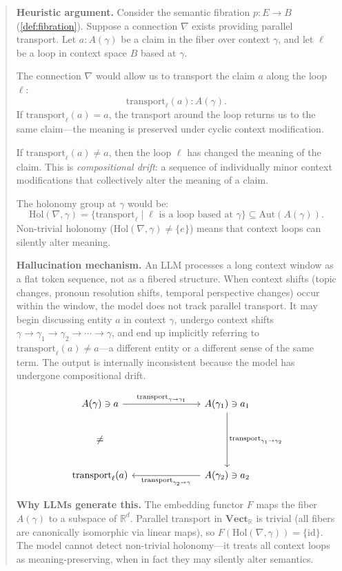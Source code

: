 \documentclass[11pt,a4paper]{article}
\theoremstyle{plain}
\theoremstyle{definition}
\theoremstyle{remark}
\newcommand{\Vect}{\mathbf{Vect}}
\newcommand{\transport}{\mathrm{transport}}
\newcommand{\id}{\mathrm{id}}
\newcommand{\R}{\mathbb{R}}
\begin{document}
\begin{quote}
\textbf{Heuristic argument.} Consider the semantic fibration $p: E \to B$ (\cref{def:fibration}). Suppose a connection $\nabla$ exists providing parallel transport. Let $a : A(\gamma)$ be a claim in the fiber over context $\gamma$, and let $\ell$ be a loop in context space $B$ based at $\gamma$.

The connection $\nabla$ would allow us to transport the claim $a$ along the loop $\ell$:
\[
\transport_\ell(a) : A(\gamma).
\]
If $\transport_\ell(a) = a$, the transport around the loop returns us to the same claim---the meaning is preserved under cyclic context modification.

If $\transport_\ell(a) \neq a$, then the loop $\ell$ has changed the meaning of the claim. This is \emph{compositional drift}: a sequence of individually minor context modifications that collectively alter the meaning of a claim.

The holonomy group at $\gamma$ would be:
\[
\mathrm{Hol}(\nabla, \gamma) = \{ \transport_\ell \mid \ell \text{ is a loop based at } \gamma \} \subseteq \mathrm{Aut}(A(\gamma)).
\]
Non-trivial holonomy ($\mathrm{Hol}(\nabla, \gamma) \neq \{e\}$) means that context loops can silently alter meaning.

\textbf{Hallucination mechanism.} An LLM processes a long context window as a flat token sequence, not as a fibered structure. When context shifts (topic changes, pronoun resolution shifts, temporal perspective changes) occur within the window, the model does not track parallel transport. It may begin discussing entity $a$ in context $\gamma$, undergo context shifts $\gamma \to \gamma_1 \to \gamma_2 \to \cdots \to \gamma$, and end up implicitly referring to $\transport_\ell(a) \neq a$---a different entity or a different sense of the same term. The output is internally inconsistent because the model has undergone compositional drift.

\[
\begin{tikzcd}[column sep=2.5cm, row sep=2cm]
A(\gamma) \ni a \arrow[r, "\transport_{\gamma \to \gamma_1}"] \arrow[d, phantom, "\neq" description] & A(\gamma_1) \ni a_1 \arrow[d, "\transport_{\gamma_1 \to \gamma_2}"] \\
\transport_\ell(a) & A(\gamma_2) \ni a_2 \arrow[l, "\transport_{\gamma_2 \to \gamma}"]
\end{tikzcd}
\]

\textbf{Why LLMs generate this.} The embedding functor $F$ maps the fiber $A(\gamma)$ to a subspace of $\R^d$. Parallel transport in $\Vect_{\R}$ is trivial (all fibers are canonically isomorphic via linear maps), so $F(\mathrm{Hol}(\nabla, \gamma)) = \{\id\}$. The model cannot detect non-trivial holonomy---it treats all context loops as meaning-preserving, when in fact they may silently alter semantics.
\end{quote}
\end{document}
